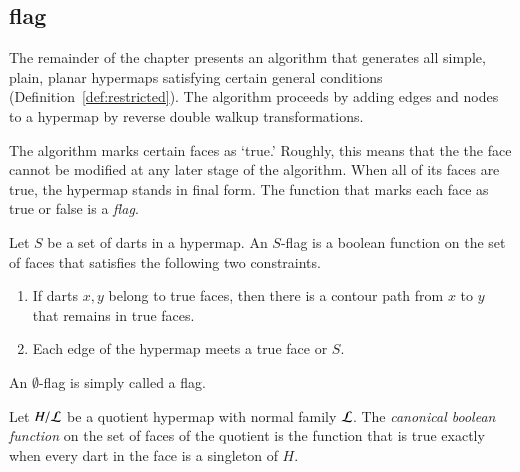 %


\subsection{flag}

The remainder of the chapter presents an algorithm that
generates all simple, plain, planar hypermaps satisfying certain general
conditions (Definition~\ref{def:restricted}).   The algorithm  proceeds by adding edges and nodes to a hypermap by reverse double walkup transformations.

The algorithm  marks certain faces as `true.'
Roughly, this  means that the the face cannot be modified
at any later stage of the algorithm.   When all of its faces
are true, the hypermap stands in final form.
The function that marks each face as true or false is a
{\it flag}.


\begin{definition}[flag]  Let $S$ be a set of darts in a hypermap.  
An $S$-flag is a boolean function on the set of faces that satisfies the following two constraints.
\begin{enumerate}
    \item If darts $x,y$ belong to true faces,
    then there is a contour path from $x$ to $y$ that remains
    in true faces.
    \item Each edge of the hypermap meets a true face or $S$.
    \end{enumerate}
An $\emptyset$-flag is simply called a flag.
\end{definition}

\begin{definition} Let $H/{\cal L}$ be a quotient hypermap with normal family $\cal L$.  The {\it canonical boolean function} on the set of faces of the quotient is the function that is true exactly when every dart in the face is a singleton of $H$.
\end{definition}

